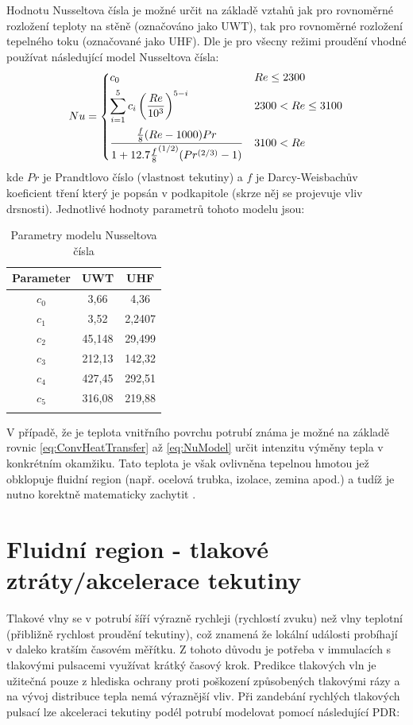 Hodnotu Nusseltova čísla je možné určit na základě vztahů jak pro rovnoměrné
rozložení teploty na stěně (označováno jako UWT), tak pro rovnoměrné rozložení
tepelného toku (označované jako UHF). Dle \cite{Abraham2009} je pro všecny
režimi proudění vhodné používat následující model Nusseltova čísla:
\begin{equation}
\label{eq:NuModel}
  Nu =
  \begin{dcases}
    c_0 & Re\leq 2300 \\
    \sum_{i=1}^{5} c_i\left(\frac{Re}{10^3}\right)^{5-i} & 2300 < Re\le 3100 \\
    \frac{\frac{f}{8}(Re-1000)Pr}
    {1+12.7{\frac{f}{8}}^{(1/2)}(Pr^{(2/3)}-1)} & 3100 < Re
  \end{dcases}
\end{equation}
kde \(Pr\) je Prandtlovo číslo (vlastnost tekutiny) a \(f\) je Darcy-Weisbachův
koeficient tření který je popsán v podkapitole  (skrze něj
se projevuje vliv drsnosti). Jednotlivé hodnoty parametrů tohoto modelu jsou:
\begin{table}[H]
  \label{tab:NuModel}
  \caption{Parametry modelu Nusseltova čísla}
  \vskip6pt
  \centering
  \begin{tabular}{ccc}
    \toprule
    Parameter & UWT & UHF \\ [0.5ex]
    \hline
    \(c_0\) & 3,66 & 4,36 \\
    \(c_1\) & 3,52 & 2,2407 \\
    \(c_2\) & 45,148 & 29,499 \\
    \(c_3\) & 212,13 & 142,32 \\
    \(c_4\) & 427,45 & 292,51 \\
    \(c_5\) & 316,08 & 219,88 \\
    \bottomrule \\[0.1mm]
  \end{tabular}
\end{table}
V případě, že je teplota vnitřního povrchu potrubí známa je možné na základě
rovnic \ref{eq:ConvHeatTransfer} až \ref{eq:NuModel} určit intenzitu výměny
tepla v konkrétním okamžiku. Tato teplota je však ovlivněna tepelnou hmotou jež
obklopuje fluidní region (např. ocelová trubka, izolace, zemina apod.) a tudíž
je nutno korektně matematicky zachytit .

\section{Fluidní region - tlakové ztráty/akcelerace tekutiny}
\label{sec:PressureLoss}
Tlakové vlny se v potrubí šíří výrazně rychleji (rychlostí zvuku) než vlny
teplotní (přibližně rychlost proudění tekutiny), což znamená že lokální
události probíhají v daleko kratším časovém měřítku. Z tohoto důvodu je potřeba
v immulacích s tlakovými pulsacemi využívat krátký časový krok. Predikce
tlakových vln je užitečná pouze z hlediska ochrany proti poškození způsobených
tlakovými rázy a na vývoj distribuce tepla nemá výraznější vliv.
Při zandebání rychlých tlakových pulsací lze akceleraci tekutiny podél potrubí
modelovat pomocí následující PDR:

